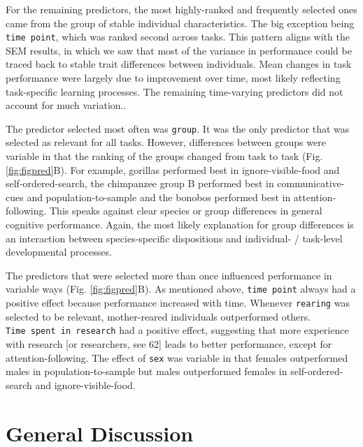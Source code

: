 \documentclass[
  man,floatsintext]{apa6}
\begin{document}
For the remaining predictors, the most highly-ranked and frequently selected ones came from the group of stable individual characteristics. The big exception being \texttt{time\ point}, which was ranked second across tasks. This pattern aligns with the SEM results, in which we saw that most of the variance in performance could be traced back to stable trait differences between individuals. Mean changes in task performance were largely due to improvement over time, most likely reflecting task-specific learning processes. The remaining time-varying predictors did not account for much variation..

The predictor selected most often was \texttt{group}. It was the only predictor that was selected as relevant for all tasks. However, differences between groups were variable in that the ranking of the groups changed from task to task (Fig. \ref{fig:figpred}B). For example, gorillas performed best in ignore-visible-food and self-ordered-search, the chimpanzee group B performed best in communicative-cues and population-to-sample and the bonobos performed best in attention-following. This speaks against clear species or group differences in general cognitive performance. Again, the most likely explanation for group differences is an interaction between species-specific dispositions and individual- / task-level developmental processes.

The predictors that were selected more than once influenced performance in variable ways (Fig. \ref{fig:figpred}B). As mentioned above, \texttt{time\ point} always had a positive effect because performance increased with time. Whenever \texttt{rearing} was selected to be relevant, mother-reared individuals outperformed others. \texttt{Time\ spent\ in\ research} had a positive effect, suggesting that more experience with research {[}or researchers, see 62{]} leads to better performance, except for attention-following. The effect of \texttt{sex} was variable in that females outperformed males in population-to-sample but males outperformed females in self-ordered-search and ignore-visible-food.

\section{General Discussion}\label{general-discussion}
\end{document}
